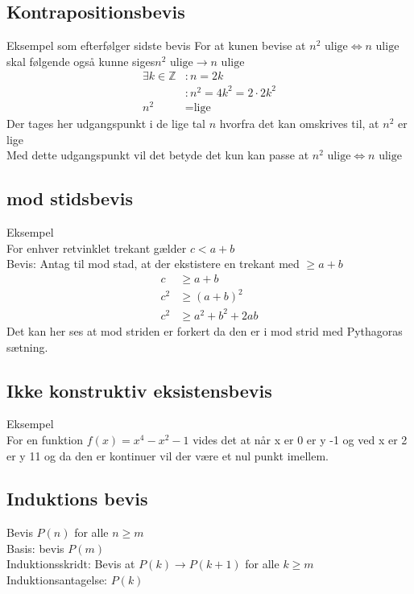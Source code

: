 \documentclass[12pt, a4paper]{article}
\begin{document}
			\subsection{Kontrapositionsbevis}
			 Eksempel som efterfølger sidste bevis 
			 	For at kunen bevise at $n^2 \text{ ulige} \iff n \text{ ulige}$ skal følgende også kunne siges$n^2 \text{ ulige} \rightarrow n \text{ ulige}$
				\begin{align}
					\exists k \in \mathbb{Z}&: n=2k\\
								&:n^2=4k^2=2\cdot 2k^2\\
					n^2&=\text{lige}
				\end{align}
				Der tages her udgangspunkt i de lige tal $n$ hvorfra det kan omskrives til, at $n^2$ er lige\\
				Med dette udgangspunkt vil det betyde det kun kan passe at $n^2 \text{ ulige} \iff n \text{ ulige}$ 
			\subsection{\; mod \;stidsbevis}
				Eksempel\\
				For enhver retvinklet trekant gælder $c < a+b$\\
				Bevis: Antag til \; mod \;stad, at der ekstistere en trekant med $\geq a+b$
				\begin{align*}
					c&\geq a+b\\
					c^2&\geq (a+b)^2\\
					c^2&\geq a^2+b^2+2ab
				\end{align*}
				Det kan her ses at \; mod \;striden er forkert da den er i \; mod \;strid med Pythagoras sætning.
			\subsection{Ikke konstruktiv eksistensbevis}
				Eksempel\\
				For en funktion $f(x)=x^4-x^2-1$ vides det at når x er 0 er y -1 og ved x er 2 er y 11 og da den er kontinuer vil der være et nul punkt imellem.
			\subsection{Induktions bevis}
				Bevis $P(n)$ for alle $n\geq m$\\
				Basis: bevis $P(m)$\\
				Induktionsskridt: Bevis at $P(k)\rightarrow P(k+1)$ for alle $k\geq m$\\
				Induktionsantagelse: $P(k)$
\end{document}
